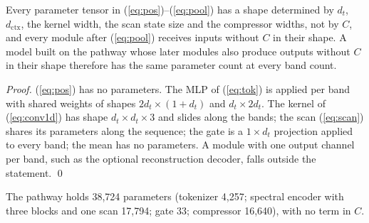 \documentclass{svproc}
\begin{document}
\begin{proposition}\label{prop:agnostic}
Every parameter tensor in (\ref{eq:pos})--(\ref{eq:pool}) has a shape determined by $d_t$, $d_{\text{ctx}}$, the kernel width, the scan state size and the compressor widths, not by $C$, and every module after (\ref{eq:pool}) receives inputs without $C$ in their shape. A model built on the pathway whose later modules also produce outputs without $C$ in their shape therefore has the same parameter count at every band count.
\end{proposition}
\begin{proof}
(\ref{eq:pos}) has no parameters. The MLP of (\ref{eq:tok}) is applied per band with shared weights of shapes $2d_t \times (1 + d_t)$ and $d_t \times 2d_t$. The kernel of (\ref{eq:conv1d}) has shape $d_t \times d_t \times 3$ and slides along the bands; the scan (\ref{eq:scan}) shares its parameters along the sequence; the gate is a $1 \times d_t$ projection applied to every band; the mean has no parameters. A module with one output channel per band, such as the optional reconstruction decoder, falls outside the statement. \qed
\end{proof}

The pathway holds 38,724 parameters (tokenizer 4,257; spectral encoder with three blocks and one scan 17,794; gate 33; compressor 16,640), with no term in $C$.
\end{document}
